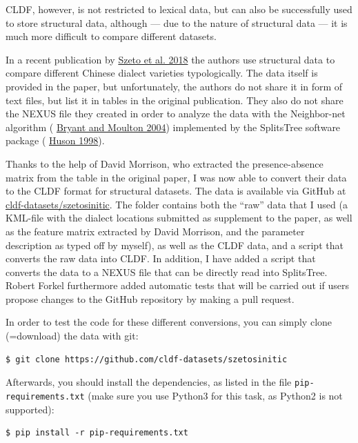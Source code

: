 \documentclass[
  a4paper,
  14pt,
  oneside,
  tablecaptionabove
]{scrbook}
\begin{document}
CLDF, however, is not restricted to lexical data, but can also be
successfully used to store structural data, although --- due to the
nature of structural data --- it is much more difficult to compare
different datasets.
 
In a recent publication by
\href{http://bibliography.lingpy.org?key=Szeto2018}{Szeto et al. 2018}
the authors use structural data to compare different Chinese dialect
varieties typologically. The data itself is provided in the paper, but
unfortunately, the authors do not share it in form of text files, but
list it in tables in the original publication. They also do not share
the NEXUS file they created in order to analyze the data with the
Neighbor-net algorithm (
\href{http://bibliography.lingpy.org?key=Bryant2004}{Bryant and Moulton
2004}) implemented by the SplitsTree software package (
\href{http://bibliography.lingpy.org?key=Huson1998}{Huson 1998}).

Thanks to the help of David Morrison, who extracted the presence-absence
matrix from the table in the original paper, I was now able to convert
their data to the CLDF format for structural datasets. The data is
available via GitHub at
\href{https://github.com/cldf-datasets/szetosinitic}{cldf-datasets/szetosinitic}.
The folder contains both the \enquote{raw} data that I used (a KML-file
with the dialect locations submitted as supplement to the paper, as well
as the feature matrix extracted by David Morrison, and the parameter
description as typed off by myself), as well as the CLDF data, and a
script that converts the raw data into CLDF. In addition, I have added a
script that converts the data to a NEXUS file that can be directly read
into SplitsTree. Robert Forkel furthermore added automatic tests that
will be carried out if users propose changes to the GitHub repository by
making a pull request.

In order to test the code for these different conversions, you can
simply clone (=download) the data with git:

\begin{lstlisting}[basicstyle=\small]
$ git clone https://github.com/cldf-datasets/szetosinitic
\end{lstlisting}

Afterwards, you should install the dependencies, as listed in the file
\lstinline!pip-requirements.txt! (make sure you use Python3 for this
task, as Python2 is not supported):

\begin{lstlisting}[basicstyle=\small]
$ pip install -r pip-requirements.txt
\end{lstlisting}
\end{document}
